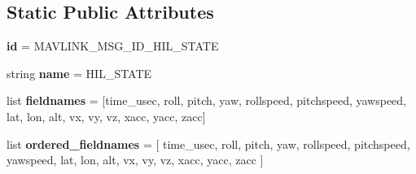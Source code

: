 \subsection*{Static Public Attributes}
\begin{DoxyCompactItemize}
\item 
\mbox{\label{classpymavlink_1_1dialects_1_1v10_1_1MAVLink__hil__state__message_aebd1f7a9f2fde916295da213c8fdf542}} 
{\bfseries id} = M\+A\+V\+L\+I\+N\+K\+\_\+\+M\+S\+G\+\_\+\+I\+D\+\_\+\+H\+I\+L\+\_\+\+S\+T\+A\+TE
\item 
\mbox{\label{classpymavlink_1_1dialects_1_1v10_1_1MAVLink__hil__state__message_abcb8ae08a8790a7523a0ef2aa831005a}} 
string {\bfseries name} = \textquotesingle{}H\+I\+L\+\_\+\+S\+T\+A\+TE\textquotesingle{}
\item 
\mbox{\label{classpymavlink_1_1dialects_1_1v10_1_1MAVLink__hil__state__message_a53f425bb64f1fb16cce0a62167751cbd}} 
list {\bfseries fieldnames} = \mbox{[}\textquotesingle{}time\+\_\+usec\textquotesingle{}, \textquotesingle{}roll\textquotesingle{}, \textquotesingle{}pitch\textquotesingle{}, \textquotesingle{}yaw\textquotesingle{}, \textquotesingle{}rollspeed\textquotesingle{}, \textquotesingle{}pitchspeed\textquotesingle{}, \textquotesingle{}yawspeed\textquotesingle{}, \textquotesingle{}lat\textquotesingle{}, \textquotesingle{}lon\textquotesingle{}, \textquotesingle{}alt\textquotesingle{}, \textquotesingle{}vx\textquotesingle{}, \textquotesingle{}vy\textquotesingle{}, \textquotesingle{}vz\textquotesingle{}, \textquotesingle{}xacc\textquotesingle{}, \textquotesingle{}yacc\textquotesingle{}, \textquotesingle{}zacc\textquotesingle{}\mbox{]}
\item 
\mbox{\label{classpymavlink_1_1dialects_1_1v10_1_1MAVLink__hil__state__message_abd80da778b1357288142cc43f702ef15}} 
list {\bfseries ordered\+\_\+fieldnames} = \mbox{[} \textquotesingle{}time\+\_\+usec\textquotesingle{}, \textquotesingle{}roll\textquotesingle{}, \textquotesingle{}pitch\textquotesingle{}, \textquotesingle{}yaw\textquotesingle{}, \textquotesingle{}rollspeed\textquotesingle{}, \textquotesingle{}pitchspeed\textquotesingle{}, \textquotesingle{}yawspeed\textquotesingle{}, \textquotesingle{}lat\textquotesingle{}, \textquotesingle{}lon\textquotesingle{}, \textquotesingle{}alt\textquotesingle{}, \textquotesingle{}vx\textquotesingle{}, \textquotesingle{}vy\textquotesingle{}, \textquotesingle{}vz\textquotesingle{}, \textquotesingle{}xacc\textquotesingle{}, \textquotesingle{}yacc\textquotesingle{}, \textquotesingle{}zacc\textquotesingle{} \mbox{]}

\end{DoxyCompactItemize}
